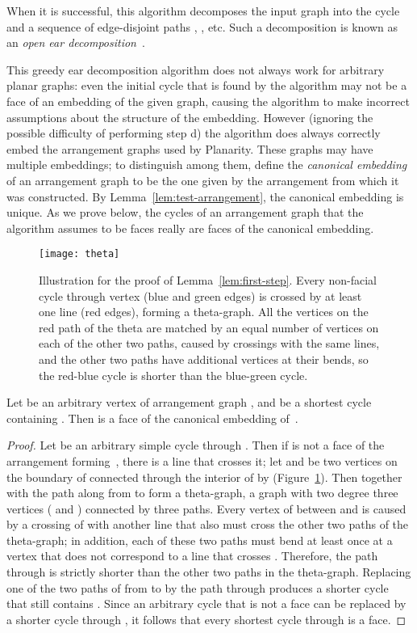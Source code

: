 \documentclass[oribibl]{llncs}
\begin{document}
When it is successful, this algorithm decomposes the input graph into the cycle  and a sequence of edge-disjoint paths , , etc. Such a decomposition is known as an \emph{open ear decomposition}~\cite{Khu-SN-89}.

This greedy ear decomposition algorithm does not always work for arbitrary planar graphs: even the initial cycle that is found by the algorithm may not be a face of an embedding of the given graph, causing the algorithm to make incorrect assumptions about the structure of the embedding. 
However (ignoring the possible difficulty of performing step d) the algorithm does always correctly embed the arrangement graphs used by Planarity. These graphs may have multiple embeddings; to distinguish among them, define the \emph{canonical embedding} of an arrangement graph to be the one given by the arrangement from which it was constructed. By Lemma~\ref{lem:test-arrangement}, the canonical embedding is unique.
 As we prove below, the cycles of an arrangement graph that the algorithm assumes to be faces really are faces of the canonical embedding.

\begin{figure}[t]
\centering\texttt{[image: theta]}
\caption{Illustration for the proof of Lemma~\ref{lem:first-step}. Every non-facial cycle  through vertex  (blue and green edges) is crossed by at least one line  (red edges), forming a theta-graph. All the vertices on the red path of the theta are matched by an equal number of vertices on each of the other two paths, caused by crossings with the same lines, and the other two paths have additional vertices at their bends, so the red-blue cycle is shorter than the blue-green cycle.}
\label{fig:theta}
\end{figure}

\begin{lemma}
\label{lem:first-step}
Let  be an arbitrary vertex of arrangement graph , and  be a shortest cycle containing . Then  is a face of the canonical embedding of~.
\end{lemma}

\begin{proof}
Let  be an arbitrary simple cycle through . Then if  is not a face of the arrangement forming~, there is a line  that crosses it; let  and  be two vertices on the boundary of  connected through the interior of  by  (Figure~\ref{fig:theta}). Then  together with the path along  from  to  form a theta-graph, a graph with two degree three vertices ( and ) connected by three paths.  Every vertex of  between  and  is caused by a crossing of  with another line that also must cross the other two paths of the theta-graph; in addition, each of these two paths must bend at least once at a vertex that does not correspond to a line that crosses .
Therefore, the path through  is strictly shorter than the other two paths in the theta-graph. Replacing one of the two paths of  from  to  by the path through  produces a shorter cycle that still contains . Since an arbitrary cycle  that is not a face can be replaced by a shorter cycle through , it follows that every shortest cycle through  is a face.
\end{proof}
\end{document}
